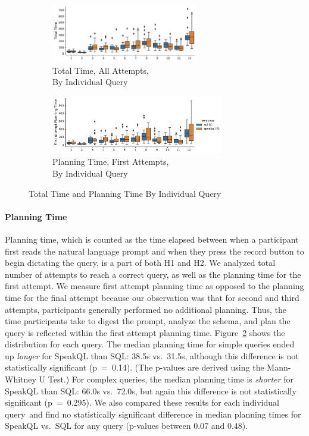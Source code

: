 \begin{figure}[t]
  \centering
  \begin{subfigure}{.4\textwidth}
    \centering
    \includegraphics[height=1.0in]{figures/query-total-time-boxplot.pdf}
    \caption{Total Time, All Attempts,\\By Individual Query}
    \label{fig:querytotaltime}
  \end{subfigure}
  \begin{subfigure}{.5\textwidth}
    \centering
    \includegraphics[height=1.0in]{figures/query-planning-time-boxplot.pdf}
    \caption{Planning Time, First Attempts,\\By Individual Query}
    \label{fig:queryplanningtime}
  \end{subfigure}
  \caption{Total Time and Planning Time By Individual Query}
  \label{fig:totalandplanningtime}
\end{figure}

\paragraph{\textbf{Planning Time}} 
Planning time, which is counted as the time elapsed between when a participant first reads the natural language prompt and when they press the record button to begin dictating the query, is a part of both H1 and H2. 
We analyzed total number of attempts to reach a correct query, as well as the planning time for the first attempt. 
We measure first attempt planning time as opposed to the planning time for the final attempt because our observation was that for second and third attempts, participants generally performed no additional planning.
Thus, the time participants take to digest the prompt, analyze the schema, and plan the query is reflected within the first attempt planning time. 
Figure~\ref{fig:queryplanningtime} shows the distribution for each query. 
The median planning time for simple queries ended up \textit{longer} for SpeakQL than SQL: 38.5s vs.~31.5s, although this difference is not statistically significant (p~=~0.14). (The p-values are derived using the Mann-Whitney U Test.) 
For complex queries, the median planning time is \textit{shorter} for SpeakQL than SQL: 66.0s vs.~72.0s, but again this difference is not statistically significant (p~=~0.295). 
We also compared these results for each individual query and find no statistically significant difference in median planning times for SpeakQL vs.~SQL for any query (p-values between 0.07 and 0.48). 

